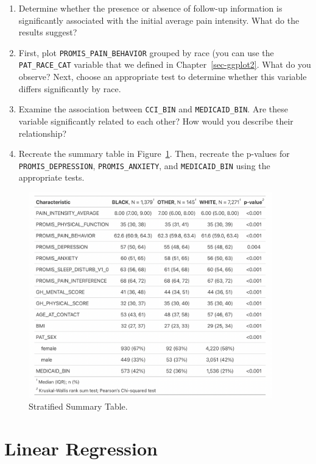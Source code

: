 \documentclass[
  letterpaper,
]{krantz}
\begin{document}
\begin{enumerate}
\def\labelenumi{\arabic{enumi}.}
\item
  Determine whether the presence or absence of follow-up information is
  significantly associated with the initial average pain intensity. What
  do the results suggest?
\item
  First, plot \texttt{PROMIS\_PAIN\_BEHAVIOR} grouped by race (you can
  use the \texttt{PAT\_RACE\_CAT} variable that we defined in
  Chapter~\ref{sec-ggplot2}. What do you observe? Next, choose an
  appropriate test to determine whether this variable differs
  significantly by race.
\item
  Examine the association between \texttt{CCI\_BIN} and
  \texttt{MEDICAID\_BIN}. Are these variable significantly related to
  each other? How would you describe their relationship?
\item
  Recreate the summary table in Figure~\ref{fig-q4}. Then, recreate the
  p-values for \texttt{PROMIS\_DEPRESSION}, \texttt{PROMIS\_ANXIETY},
  and \texttt{MEDICAID\_BIN} using the appropriate tests.
\end{enumerate}

\begin{figure}

{\centering \includegraphics[width=4.16667in,height=\textheight]{book/images/9-exercise4.png}

}

\caption{\label{fig-q4}Stratified Summary Table.}

\end{figure}


\hypertarget{sec-linear-regression}{%
\chapter{Linear Regression}\label{sec-linear-regression}}
\end{document}
